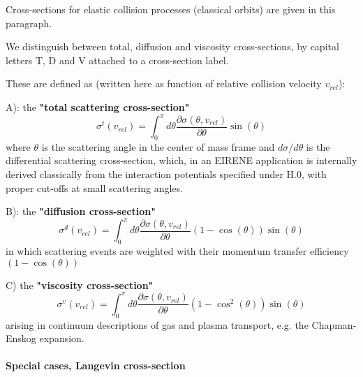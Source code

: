 \documentclass[12pt,dvipdfmx]{article}
\begin{document}
Cross-sections for elastic collision processes (classical orbits) are given in this paragraph.

We distinguish between total, diffusion and viscosity cross-sections, by capital letters T, D and V
attached to a cross-section label.

These are defined as (written here as function of relative collision velocity $v_{rel}$):

A): the \textbf{"total scattering cross-section"}
\begin{equation}
\sigma^t(v_{rel}) = \int_0^{\pi} d\theta \frac{\partial\sigma(\theta,v_{rel})}{\partial\theta} \sin(\theta)
\end{equation}
where $\theta$ is the scattering angle in the center of mass frame and $d\sigma/d\theta$ is the differential scattering cross-section,
which, in an EIRENE application is internally derived classically from the interaction potentials specified under H.0, with proper cut-offs
at small scattering angles.

B): the \textbf{"diffusion cross-section"}
\begin{equation}
\sigma^d(v_{rel}) = \int_0^{\pi} d\theta \frac{\partial\sigma(\theta,v_{rel})}{\partial\theta} (1-\cos(\theta)) \sin(\theta)
\end{equation}
in which scattering events are weighted with their momentum transfer efficiency  $(1-\cos(\theta))$

C) the \textbf{"viscosity cross-section"}
\begin{equation}
\sigma^v(v_{rel}) = \int_0^{\pi} d\theta \frac{\partial\sigma(\theta,v_{rel})}{\partial\theta} (1-\cos^2(\theta)) \sin(\theta)
\end{equation}
arising in continuum descriptions of gas and plasma transport, e.g. the Chapman-Enskog expansion.

\paragraph*{\textbf{Special cases, Langevin cross-section}}
\end{document}
